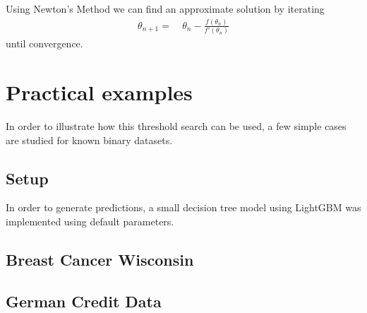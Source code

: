 \documentclass{article}
\begin{document}
Using Newton's Method we can find an approximate solution by iterating
\begin{align}
    \theta_{n+1} =& \ \theta_n - \frac{f(\theta_n)}{f'(\theta_n)}
\end{align}
until convergence.

\section{Practical examples}
In order to illustrate how this threshold search can be used, a few simple cases are studied for known binary datasets.
\subsection{Setup}
In order to generate predictions, a small decision tree model using LightGBM was implemented using default parameters. 
\subsection{Breast Cancer Wisconsin}

\subsection{German Credit Data}



\end{document}
